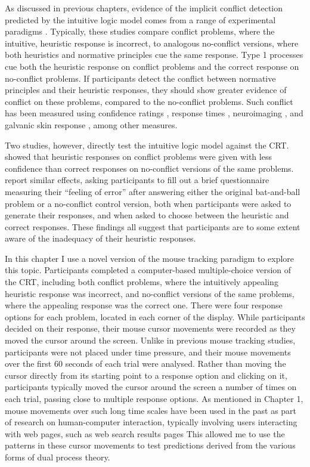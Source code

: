 As discussed in previous chapters, evidence of
the implicit conflict detection predicted by the intuitive logic model
comes from a range of experimental paradigms
\citep[see also][for a review]{DeNeys2012}.
Typically, these studies compare conflict problems,
where the intuitive, heuristic response is incorrect,
to analogous no-conflict versions,
where both heuristics and normative principles cue the same response.
Type 1 processes cue both the heuristic response on conflict problems
and the correct response on no-conflict problems.
If participants detect the conflict between
normative principles and their heuristic responses,
they should show greater evidence of conflict on these problems,
compared to the no-conflict problems.
Such conflict has been measured using confidence ratings
\citep{DeNeys2011b},
response times \citep{DeNeys2008},
neuroimaging \citep{DeNeys2008a},
and galvanic skin response \citep{DeNeys2010},
among other measures.

Two studies, however, directly test the intuitive logic model against the CRT.
\citet{DeNeys2013a} showed that heuristic responses on conflict problems
were given with less confidence than correct responses on no-conflict versions of the same problems.
\citet{Gangemi2015} report similar effects,
asking participants to fill out a brief questionnaire
measuring their ``feeling of error'' after answering either
the original bat-and-ball problem or a no-conflict control version,
both when participants were asked to generate their responses,
and when asked to choose between the heuristic and correct responses.
These findings all suggest that participants are to some extent
aware of the inadequacy of their heuristic responses. 


In this chapter I use a novel version of the mouse tracking paradigm
to explore this topic.
Participants completed a computer-based multiple-choice version of the CRT,
including both conflict problems,
where the intuitively appealing heuristic response was incorrect,
and no-conflict versions of the same problems,
where the appealing response was the correct one.
There  were four response options for each problem,
located in each corner of the display.
While participants decided on their response,
their mouse cursor movements were recorded
as they moved the cursor around the screen.
Unlike in previous mouse tracking studies,
participants were not placed under time pressure,
and their mouse movements over the first 60 seconds of each trial were analysed.
Rather than moving the cursor directly from its starting point
to a response option and clicking on it,
participants typically moved the cursor
around the screen a number of times on each trial,
passing close to multiple response options.
As mentioned in Chapter 1,
mouse movements over such long time scales
have been used in the past
as part of research on human-computer interaction,
typically involving users interacting with web pages,
such as web search results pages
\citep[e.g.][]{Chen2001,Rodden2008,Huang2011}
This allowed me to use the patterns in these cursor movements
to test predictions derived from the various forms of dual process theory.


